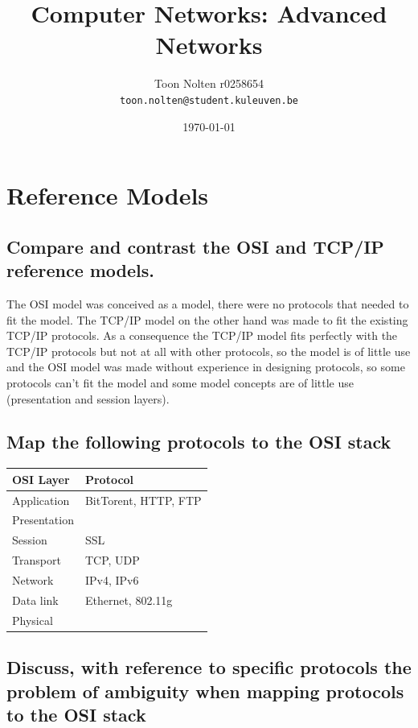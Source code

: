 \documentclass[9pt, a4paper, oneside]{article}
\begin{document}
\title{Computer Networks: Advanced Networks}
\author{Toon Nolten r0258654\\
    \texttt{toon.nolten@student.kuleuven.be}
        }
\date{\today}
\maketitle

\newpage

\section{Reference Models}

\subsection{Compare and contrast the OSI and TCP/IP reference models.}

The OSI model was conceived as a model, there were no protocols that needed to
fit the model. The TCP/IP model on the other hand was made to fit the existing
TCP/IP protocols. As a consequence the TCP/IP model fits perfectly
with the TCP/IP protocols but not at all with other protocols, so the model
is of little use and the OSI model was made without experience in designing
protocols, so some protocols can't fit the model and some model concepts are
of little use (presentation and session layers).

\subsection{Map the following protocols to the OSI stack}

\begin{center}
\begin{tabular}{l | l}
    OSI Layer & Protocol \\
    \hline
    Application & BitTorent, HTTP, FTP \\
    Presentation &  \\
    Session & SSL \\
    Transport & TCP, UDP \\
    Network & IPv4, IPv6 \\
    Data link & Ethernet, 802.11g \\
    Physical &  \\
\end{tabular}
\end{center}

\subsection{Discuss, with reference to specific protocols the problem of
            ambiguity when mapping protocols to the OSI stack}
\end{document}
